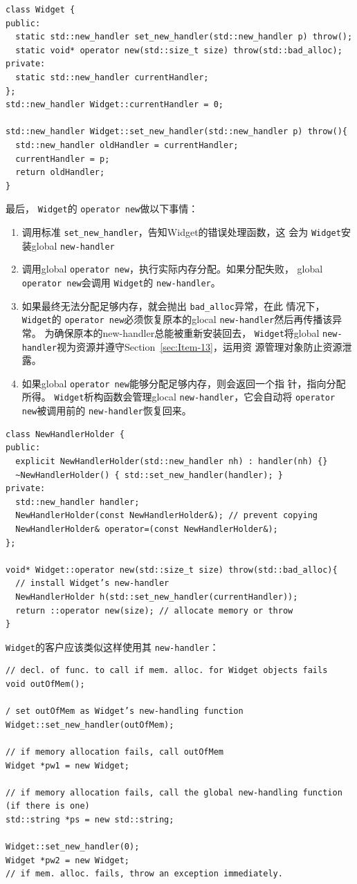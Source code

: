 \documentclass[a4paper,twoside]{article}
\theoremstyle{definition}
\theoremstyle{remark}
\numberwithin{equation}{section}
\let\OldTexttt\texttt
\renewcommand{\texttt}[1]{{\color{blue} \OldTexttt{#1}}}
\begin{document}
\begin{verbatim}
class Widget {
public:
  static std::new_handler set_new_handler(std::new_handler p) throw();
  static void* operator new(std::size_t size) throw(std::bad_alloc);
private:
  static std::new_handler currentHandler;
};
std::new_handler Widget::currentHandler = 0;

std::new_handler Widget::set_new_handler(std::new_handler p) throw(){
  std::new_handler oldHandler = currentHandler;
  currentHandler = p;
  return oldHandler;
}
\end{verbatim}
最后， \texttt{Widget}的\texttt{operator new}做以下事情：
\begin{enumerate}
\item 调用标准\texttt{set\_new\_handler}，告知Widget的错误处理函数，这
  会为\texttt{Widget}安装global \texttt{new-handler}
\item 调用global \texttt{operator new}，执行实际内存分配。如果分配失败，
  global \texttt{operator new}会调用\texttt{Widget}的
  \texttt{new-handler}。
\item 如果最终无法分配足够内存，就会抛出\texttt{bad\_alloc}异常，在此
  情况下，\texttt{Widget}的\texttt{operator new}必须恢复原本的glocal
  \texttt{new-handler}然后再传播该异常。 
  为确保原本的new-handler总能被重新安装回去，\texttt{Widget}将global
  \texttt{new-handler}视为资源并遵守Section~\ref{sec:Item-13}，运用资
  源管理对象防止资源泄露。
\item 如果global \texttt{operator new}能够分配足够内存，则会返回一个指
  针，指向分配所得。\texttt{Widget}析构函数会管理glocal
  \texttt{new-handler}，它会自动将\texttt{operator new}被调用前的
  \texttt{new-handler}恢复回来。
\end{enumerate}

\begin{verbatim}
class NewHandlerHolder {
public:
  explicit NewHandlerHolder(std::new_handler nh) : handler(nh) {}
  ~NewHandlerHolder() { std::set_new_handler(handler); }
private:
  std::new_handler handler;
  NewHandlerHolder(const NewHandlerHolder&); // prevent copying
  NewHandlerHolder& operator=(const NewHandlerHolder&);
};

void* Widget::operator new(std::size_t size) throw(std::bad_alloc){
  // install Widget’s new-handler
  NewHandlerHolder h(std::set_new_handler(currentHandler)); 
  return ::operator new(size); // allocate memory or throw
}
\end{verbatim}

\texttt{Widget}的客户应该类似这样使用其\texttt{new-handler}：
\begin{verbatim}
// decl. of func. to call if mem. alloc. for Widget objects fails
void outOfMem(); 

/ set outOfMem as Widget’s new-handling function
Widget::set_new_handler(outOfMem);

// if memory allocation fails, call outOfMem
Widget *pw1 = new Widget; 

// if memory allocation fails, call the global new-handling function (if there is one)
std::string *ps = new std::string; 

Widget::set_new_handler(0);
Widget *pw2 = new Widget; 
// if mem. alloc. fails, throw an exception immediately.
\end{verbatim}
\end{document}
